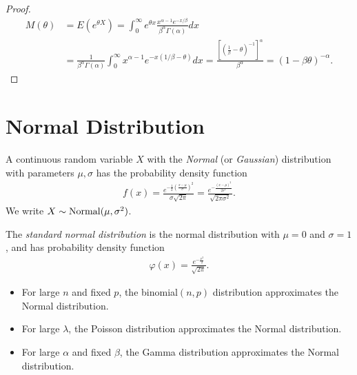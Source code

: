 \begin{proof}
    \begin{align*}
        M(\theta) &= E(e^{\theta X}) = \int_{0}^{\infty}e^{\theta x}\frac{x^{\alpha-1}e^{-x/\beta}}{\beta^{\alpha}\Gamma(\alpha)}dx \\
        &= \frac{1}{\beta^{\alpha}\Gamma(\alpha)}\int_{0}^{\infty}x^{\alpha-1}e^{-x(1/\beta-\theta)}dx = \frac{\left[\left(\frac{1}{\beta}-\theta\right)^{-1}\right]^{\alpha}}{\beta^{\alpha}} = (1 - \beta\theta)^{-\alpha}.
    \end{align*}
\end{proof}

\section{Normal Distribution}

\begin{defn}
    A continuous random variable $X$ with the \emph{Normal} (or \emph{Gaussian}) distribution with parameters $\mu, \sigma$ has the probability density function
    \begin{align*}
        f(x) = \frac{e^{-\frac{1}{2}\left(\frac{x - \mu}{\sigma}\right)^2}}{\sigma\sqrt{2\pi}} = \frac{e^{-\frac{\left(x - \mu\right)^2}{2\sigma^2}}}{\sqrt{2\pi\sigma^2}}.
    \end{align*}
    We write $X \sim \mathrm{Normal}(\mu, \sigma^2)$.
\end{defn}

\begin{defn}
    The \emph{standard normal distribution} is the normal distribution with $\mu = 0$ and $\sigma = 1$, and has probability density function
    \begin{align*}
        \varphi(x) = \frac{e^{-\frac{x^2}{2}}}{\sqrt{2\pi}}.
    \end{align*}
\end{defn}

\begin{rmk}\proofbreak
    \begin{itemize}
        \item For large $n$ and fixed $p$, the binomial$(n, p)$ distribution approximates the Normal distribution.
        \item For large $\lambda$, the Poisson distribution approximates the Normal distribution.
        \item For large $\alpha$ and fixed $\beta$, the Gamma distribution approximates the Normal distribution.
    \end{itemize}
\end{rmk}

